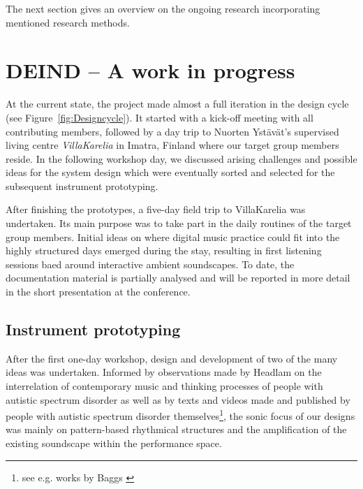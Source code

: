 \documentclass{chi-ext}
\begin{document}
\begin{multicols}{2}
The next section gives an overview on the ongoing research incorporating mentioned research methods.

\section{DEIND – A work in progress}
\label{sec:progress}

At the current state, the project made almost a full iteration in the design cycle (see Figure~\ref{fig:Designcycle}).
It started with a kick-off meeting with all contributing members, followed  by a day trip to Nuorten Ystävät's supervised living centre \emph{VillaKarelia} in Imatra, Finland where our target group members reside.
In the following workshop day, we discussed arising challenges and possible ideas for the system design which were eventually sorted and selected for the subsequent instrument prototyping. 

After finishing the prototypes, a five-day field trip to VillaKarelia was undertaken. 
Its main purpose was to take part in the daily routines of the target group members.
Initial ideas on where digital music practice could fit into the highly structured days emerged during the stay, resulting in first listening sessions baed around interactive ambient soundscapes.
To date, the documentation material is partially analysed and will be reported in more detail in the short presentation at the conference. 



\subsection{Instrument prototyping}
\label{sec:instrument_prototyping}

After the first one-day workshop, design and development of two of the many ideas was undertaken.
Informed by observations made by Headlam on the interrelation of contemporary music and thinking processes of people with autistic spectrum disorder \cite{headlam2006-lea} as well as by texts and videos made and published by people with autistic spectrum disorder themselves\footnote{see e.g. works by Baggs \cite{baggs2007-in}}, the sonic focus of our designs was mainly on pattern-based rhythmical structures and the amplification of the existing soundscape within the performance space.


\end{multicols}
\end{document}
